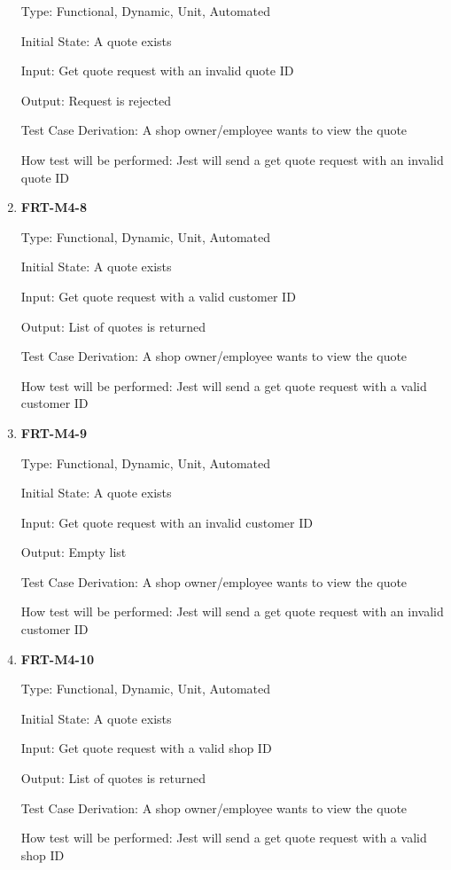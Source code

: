 \documentclass[12pt, titlepage]{article}
\begin{document}
\begin{enumerate}
	      Type: Functional, Dynamic, Unit, Automated

	      Initial State: A quote exists

	      Input: Get quote request with an invalid quote ID

	      Output: Request is rejected

	      Test Case Derivation: A shop owner/employee wants to view the quote

	      How test will be performed: Jest will send a get quote request with an invalid quote ID

	\item \textbf{FRT-M4-8}

	      Type: Functional, Dynamic, Unit, Automated

	      Initial State: A quote exists

	      Input: Get quote request with a valid customer ID

	      Output: List of quotes is returned

	      Test Case Derivation: A shop owner/employee wants to view the quote

	      How test will be performed: Jest will send a get quote request with a valid customer ID

	\item \textbf{FRT-M4-9}

	      Type: Functional, Dynamic, Unit, Automated

	      Initial State: A quote exists

	      Input: Get quote request with an invalid customer ID

	      Output: Empty list

	      Test Case Derivation: A shop owner/employee wants to view the quote

	      How test will be performed: Jest will send a get quote request with an invalid customer ID

	\item \textbf{FRT-M4-10}

	      Type: Functional, Dynamic, Unit, Automated

	      Initial State: A quote exists

	      Input: Get quote request with a valid shop ID

	      Output: List of quotes is returned

	      Test Case Derivation: A shop owner/employee wants to view the quote

	      How test will be performed: Jest will send a get quote request with a valid shop ID


\end{enumerate}
\end{document}
